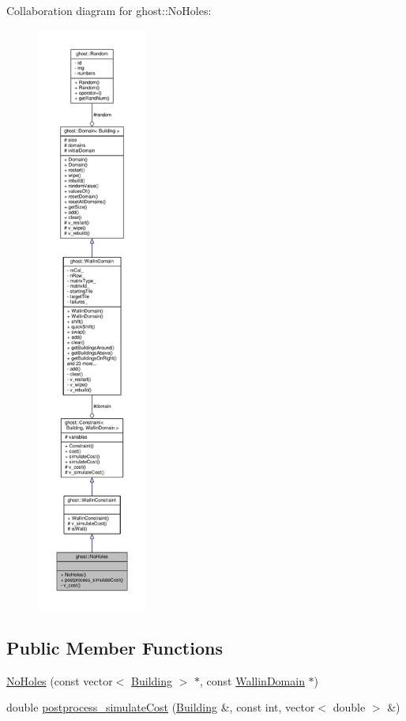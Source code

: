 Collaboration diagram for ghost\-:\-:No\-Holes\-:
\nopagebreak
\begin{figure}[H]
\begin{center}
\leavevmode
\includegraphics[height=550pt]{classghost_1_1NoHoles__coll__graph}
\end{center}
\end{figure}
\subsection*{Public Member Functions}
\begin{DoxyCompactItemize}
\item 
\hyperlink{classghost_1_1NoHoles_a733e02db6f75497ac2c6189a5c720416}{No\-Holes} (const vector$<$ \hyperlink{classghost_1_1Building}{Building} $>$ $\ast$, const \hyperlink{classghost_1_1WallinDomain}{Wallin\-Domain} $\ast$)
\item 
double \hyperlink{classghost_1_1NoHoles_a318ce38dd9fa21877852ed7007ad95d5}{postprocess\-\_\-simulate\-Cost} (\hyperlink{classghost_1_1Building}{Building} \&, const int, vector$<$ double $>$ \&)
\end{DoxyCompactItemize}
